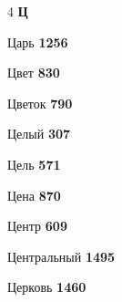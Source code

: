 \begin{multicols}{4}
\vspace{0.6em}\noindent\textbf{\normalsize\sffamily\color{primary} Ц}\par\vspace{0.2em}
\noindent Царь \dotfill \textbf{\color{secondary} 1256}\par
\noindent Цвет \dotfill \textbf{\color{secondary} 830}\par
\noindent Цветок \dotfill \textbf{\color{secondary} 790}\par
\noindent Целый \dotfill \textbf{\color{secondary} 307}\par
\noindent Цель \dotfill \textbf{\color{secondary} 571}\par
\noindent Цена \dotfill \textbf{\color{secondary} 870}\par
\noindent Центр \dotfill \textbf{\color{secondary} 609}\par
\noindent Центральный \dotfill \textbf{\color{secondary} 1495}\par
\noindent Церковь \dotfill \textbf{\color{secondary} 1460}\par


\end{multicols}
